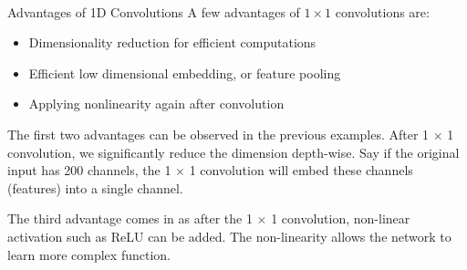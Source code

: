 {    \\
    \begin{itemize}
    \end{itemize}
}

\begin{vbframe}{Advantages of 1D Convolutions}
A few advantages of $1 \times 1$ convolutions are:
   \begin{itemize}
     \item Dimensionality reduction for efficient computations
     \item Efficient low dimensional embedding, or feature pooling     
     \item Applying nonlinearity again after convolution
     \end{itemize}
The first two advantages can be observed in the previous examples. After 1 $\times$ 1 convolution, we significantly reduce the dimension depth-wise. Say if the original input has 200 channels, the 1  $\times$ 1 convolution will embed these channels (features) into a single channel. 

The third advantage comes in as after the 1  $\times$ 1 convolution, non-linear activation such as ReLU can be added. The non-linearity allows the network to learn more complex function.

\end{vbframe}

